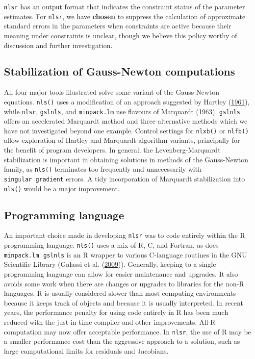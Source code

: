 \texttt{nlsr} has an output format that indicates the constraint status of the parameter
estimates. For \texttt{nlsr}, we have \textbf{chosen} to suppress the calculation of
approximate standard errors in the parameters when constraints are active because
their meaning under constraints is unclear, though we believe this
policy worthy of discussion and further investigation.

\hypertarget{stabilization-of-gauss-newton-computations}{%
\subsection{Stabilization of Gauss-Newton computations}\label{stabilization-of-gauss-newton-computations}}

All four major tools illustrated solve some variant of the Gauss-Newton
equations. \texttt{nls()} uses a modification of an approach suggested by Hartley (\protect\hyperlink{ref-Hartley1961}{1961}),
while \texttt{nlsr}, \texttt{gslnls}, and \texttt{minpack.lm} use flavours of Marquardt (\protect\hyperlink{ref-Marquardt1963}{1963}). \texttt{gslnls}
offers an accelerated Marquardt method and three alternative methods which we
have not investigated beyond one example.
Control settings for \texttt{nlxb()} or \texttt{nlfb()} allow exploration of Hartley and Marquardt
algorithm variants, principally for the benefit of program developers.
In general, the Levenberg-Marquardt stabilization
is important in obtaining
solutions in methods of the Gauss-Newton family, as \texttt{nls()} terminates
too frequently and unnecessarily with \texttt{singular\ gradient} errors. A tidy
incorporation of Marquardt stabilization into \texttt{nls()} would be a major improvement.

\hypertarget{programming-language}{%
\subsection{Programming language}\label{programming-language}}

An important choice made in developing \texttt{nlsr} was to code entirely within the R
programming language. \texttt{nls()} uses a mix of R, C, and Fortran, as does \texttt{minpack.lm}.
\texttt{gslnls} is an R wrapper to various C-language routines in the GNU Scientific
Library (Galassi et al. (\protect\hyperlink{ref-GSL-manual}{2009})).
Generally, keeping to a single programming language can allow for
easier maintenance and upgrades. It also avoids some work when there are changes
or upgrades to libraries for the non-R languages.
R is usually considered slower
than most computing environments because it keeps track of objects and
because it is usually interpreted. In recent years, the
performance penalty for using code entirely in R has been much reduced
with the just-in-time compiler and other improvements. All-R computation
may now offer acceptable performance. In \texttt{nlsr}, the use of R may be a
smaller performance cost than the aggressive approach to a solution,
such as large computational limits for residuals and Jacobians.

